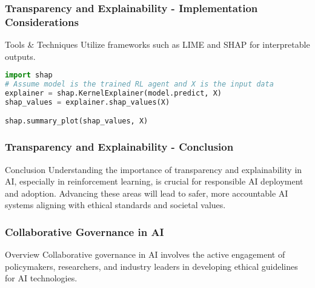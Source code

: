 \documentclass[aspectratio=169]{beamer}
\begin{document}
\begin{frame}[fragile]
    \frametitle{Transparency and Explainability - Implementation Considerations}
    \begin{block}{Tools \& Techniques}
        Utilize frameworks such as LIME and SHAP for interpretable outputs.
    \end{block}
    \begin{lstlisting}[language=Python, caption=Example Code Snippet]
import shap
# Assume model is the trained RL agent and X is the input data
explainer = shap.KernelExplainer(model.predict, X)
shap_values = explainer.shap_values(X)

shap.summary_plot(shap_values, X)
    \end{lstlisting}
\end{frame}

\begin{frame}[fragile]
    \frametitle{Transparency and Explainability - Conclusion}
    \begin{block}{Conclusion}
        Understanding the importance of transparency and explainability in AI, especially in reinforcement learning, is crucial for responsible AI deployment and adoption. 
        Advancing these areas will lead to safer, more accountable AI systems aligning with ethical standards and societal values.
    \end{block}
\end{frame}

\begin{frame}[fragile]
    \frametitle{Collaborative Governance in AI}
    \begin{block}{Overview}
        Collaborative governance in AI involves the active engagement of policymakers, researchers, and industry leaders in developing ethical guidelines for AI technologies.
    \end{block}
\end{frame}
\end{document}
